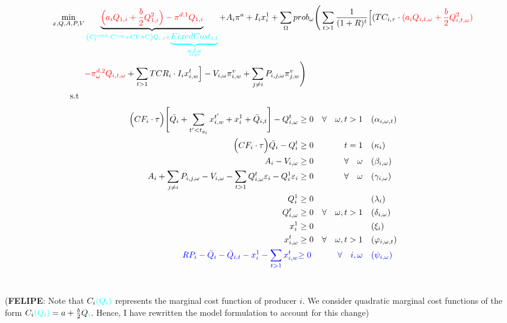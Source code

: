 \documentclass[11pt, letterpaper]{article}
\newcommand{\seba}{\textcolor[rgb]{0,1,1}}
\begin{document}
\small
\begin{align}
\min_{x,Q,A,P,V} & \underbrace{{\color{red}\Big(a_iQ_{1,i}+\frac{b}{2}Q_{1,i}^{2}\Big)-\pi^{d,1} Q_{1,i}}}_{\seba{\left(C_t^{comb}\cdot C^{esp}+CVnC\right)Q_{i,t}+\underbrace{FixedCost_{i,t}}_{\frac{\alpha\cdot I\cdot x}{algo}}}} + A_i \pi^{a} + I_i x_i^{1} + \sum_{\Omega} prob_\omega   \Bigg( \sum_{t>1} \frac{1}{(1+R)^t} \Big[ (TC_{i,\tau}\cdot {\color{red}(a_i Q_{i,t,\omega}+\frac{b}{2}Q_{i,t,\omega}^{2})}\nonumber \\
    & {\color{red}-\pi^{d,2}_{\omega} Q_{i,t,\omega}} + \sum_{t > 1} TCR_i \cdot I_ix^{t}_{i,w} \Big] - V_{i,\omega}\pi_{i,w}^v+\sum_{j\neq i}  P_{i,j,\omega}\pi_{j,w}^v\Bigg)  \\
     \textrm{s.t \ } \nonumber
\end{align}
\begin{align}
    \Big(CF_i \cdot\tau\Big)  \Bigg[\bar{Q_i} + \sum_{t^{\prime}<t_{y_i}} x^{t^{\prime}}_{i,w} + x_i^{1}+ \bar{Q}_{i,t} \Bigg] - Q_{i,\omega}^{t} & \geq 0  & \forall  \quad \omega, t  > 1 & \quad (\alpha_{i,\omega,t}) \label{const.1}\\
    \Big(CF_i\cdot\tau \Big)\bar{Q_i}-Q_{i}^{t} & \geq 0  &  \quad t  =1 & \quad (\kappa_i) \label{const.2} \\
 A_{i} -V_{i,\omega} & \geq  0  & \forall  \quad \omega & \quad (\beta_{i,\omega})\\
 A_{i} + \sum_{j \neq i}P_{i,j,\omega} - V_{i,\omega}-\sum_{t>1}Q_{i, \omega}^{t}\varepsilon_{i}-Q_i^{1}\varepsilon_{i} & \geq  0  &\forall \quad \omega & \quad (\gamma_{i,\omega})\\
 Q_i^{1} & \geq  0 & \quad & \quad (\lambda_i)\\
 Q_{i, \omega}^{t} & \geq  0   & \forall  \quad \omega, t >1 & \quad (\delta_{i,\omega})\\
  x_i^{1} & \geq  0 & \quad & \quad (\xi_i)\\
  x_{i, \omega}^{t} & \geq  0   & \forall  \quad \omega, t >1 & \quad (\varphi_{i,\omega,t})\\
{\color{blue} RP_i - \bar{Q}_i - \bar{Q}_{i,t} - x^{1}_i - \sum_{t > 1} x^{t}_{i,w} } & {\color{blue} \geq 0} & {\color{blue} \forall \quad i,\omega }&  {\color{blue} \quad (\psi_{i,\omega}) }
  \end{align}\\
\normalsize  
  
 
 (\textbf{FELIPE}: Note that $C_i\seba{(Q_i)}$ represents the \seba{marginal} cost function of producer $i$. We consider quadratic \seba{marginal} cost functions of the form $C_i\seba{(Q_i)}=a+\frac{b}{2}Q\seba{_i}$. Hence, I have rewritten the model formulation to account for this change)
\end{document}
